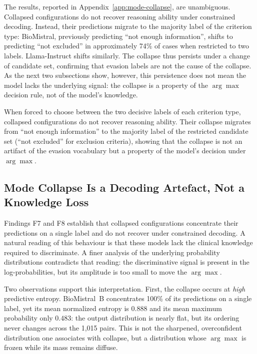 The results, reported in Appendix~\ref{app:mode-collapse}, are 
unambiguous. Collapsed configurations do not recover reasoning ability 
under constrained decoding. Instead, their predictions migrate to the 
majority label of the criterion type: BioMistral, previously predicting 
``not enough information'', shifts to predicting ``not excluded'' in 
approximately 74\% of cases when restricted to two labels. Llama-Instruct 
shifts similarly. The collapse thus persists under a change of candidate 
set, confirming that evasion labels are not the cause of the collapse. As 
the next two subsections show, however, this persistence does not mean 
the model lacks the underlying signal: the collapse is a property of the 
$\arg\max$ decision rule, not of the model's knowledge.

\begin{finding}
    When forced to choose between the two decisive labels of each 
    criterion type, collapsed configurations do not recover reasoning 
    ability. Their collapse migrates from ``not enough information'' to 
    the majority label of the restricted candidate set (``not excluded'' 
    for exclusion criteria), showing that the collapse is not an artifact 
    of the evasion vocabulary but a property of the model's decision under 
    $\arg\max$.
\end{finding}

\subsection{Mode Collapse Is a Decoding Artefact, Not a Knowledge Loss}
\label{subsec:res-collapse-decoding}

Findings F7 and F8 establish that collapsed configurations concentrate 
their predictions on a single label and do not recover under constrained 
decoding. A natural reading of this behaviour is that these models lack 
the clinical knowledge required to discriminate. A finer analysis of the 
underlying probability distributions contradicts that reading: the 
discriminative signal is present in the log-probabilities, but its 
amplitude is too small to move the $\arg\max$.

Two observations support this interpretation. First, the collapse occurs 
at \emph{high} predictive entropy. BioMistral~B concentrates 100\% of its 
predictions on a single label, yet its mean normalized entropy is $0.888$ 
and its mean maximum probability only $0.483$: the output distribution is 
nearly flat, but its ordering never changes across the 1{,}015 pairs. 
This is not the sharpened, overconfident distribution one associates with 
collapse, but a distribution whose $\arg\max$ is frozen while its mass 
remains diffuse.

